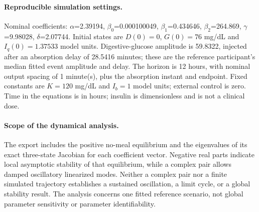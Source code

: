 \paragraph{Reproducible simulation settings.}
Nominal coefficients: $\alpha$=2.39194, $\beta_0$=0.000100049, $\beta_1$=0.434646, $\beta_2$=264.869, $\gamma$=9.98028, $\delta$=2.07744. Initial states are $D(0)=0$, $G(0)=76$ mg/dL and $I_q(0)=1.37533$ model units. Digestive-glucose amplitude is 59.8322, injected after an absorption delay of 28.5416 minutes; these are the reference participant's median fitted event amplitude and delay. The horizon is 12 hours, with nominal output spacing of 1 minute(s), plus the absorption instant and endpoint. Fixed constants are $K=120$ mg/dL and $I_b=1$ model units; external control is zero. Time in the equations is in hours; insulin is dimensionless and is not a clinical dose.

\paragraph{Scope of the dynamical analysis.}
The export includes the positive no-meal equilibrium and the eigenvalues of its exact three-state Jacobian for each coefficient vector. Negative real parts indicate local asymptotic stability of that equilibrium, while a complex pair allows damped oscillatory linearized modes. Neither a complex pair nor a finite simulated trajectory establishes a sustained oscillation, a limit cycle, or a global stability result. The analysis concerns one fitted reference scenario, not global parameter sensitivity or parameter identifiability.
